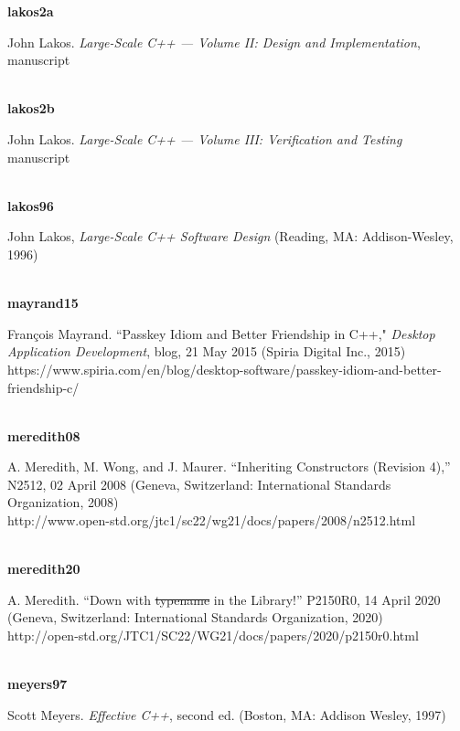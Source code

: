 \noindent\textbf{lakos2a}\\
\hspace*{2em}\parbox[t]{\textwidth}{John Lakos. \textit{Large-Scale C++ --- Volume II: Design and Implementation}, manuscript} \\

\noindent\textbf{lakos2b}\\
\hspace*{2em}\parbox[t]{\textwidth}{John Lakos. \textit{Large-Scale C++ --- Volume III: Verification and Testing} manuscript} \\

\noindent\textbf{lakos96}\\
\hspace*{2em}\parbox[t]{\textwidth}{John Lakos, \textit{Large-Scale C++ Software Design} (Reading, MA: Addison-Wesley, 1996)} \\

\noindent\textbf{mayrand15}\\
\hspace*{2em}\parbox[t]{\textwidth}{Fran\c{c}ois Mayrand. ``Passkey Idiom and Better Friendship in C++," \textit{Desktop Application Development}, blog, 21 May 2015 (Spiria Digital Inc., 2015)\\
https://www.spiria.com/en/blog/desktop-software/passkey-idiom-and-better-friendship-c/}\\

\noindent\textbf{meredith08}\\
\hspace*{2em}\parbox[t]{\textwidth}{A. Meredith, M. Wong, and J. Maurer. ``Inheriting Constructors (Revision 4),” N2512, 02 April 2008  (Geneva, Switzerland: International Standards Organization, 2008)\\
http://www.open-std.org/jtc1/sc22/wg21/docs/papers/2008/n2512.html}\\

\noindent\textbf{meredith20}\\
\hspace*{2em}\parbox[t]{\textwidth}{A. Meredith. ``Down with \sout{typename} in the Library!” P2150R0, 14 April 2020 (Geneva, Switzerland: International Standards Organization, 2020)\\
http://open-std.org/JTC1/SC22/WG21/docs/papers/2020/p2150r0.html}\\

\noindent\textbf{meyers97}\\
\hspace*{2em}\parbox[t]{\textwidth}{Scott Meyers. \textit{Effective C++}, second ed. (Boston, MA: Addison Wesley, 1997)} \\

